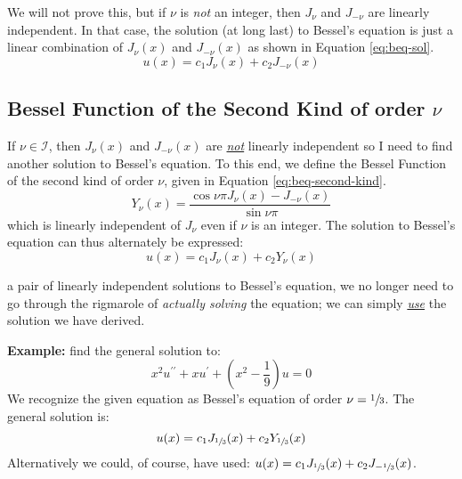 We will not prove this, but if $\nu$ is \emph{not} an integer, then $J_{\nu}$ and $J_{-\nu}$ are linearly independent. In that case, the solution (at long last) to Bessel's equation is just a linear combination of $J_{\nu}(x)$ and $J_{-\nu}(x)$ as shown in Equation \ref{eq:beq-sol}.
\begin{equation}
u(x) = c_1J_{\nu}(x) + c_2J_{-\nu}(x)
\label{eq:beq-sol}
\end{equation}

\subsection{Bessel Function of the Second Kind of order $\nu$}
If $\nu \in \mathcal{I}$, then $J_{\nu}(x)$ and $J_{-\nu}(x)$ are \emph{\underline{not}} linearly independent so I need to find another solution to Bessel's equation.  To this end, we define the Bessel Function of the second kind of order $\nu$, given in Equation \ref{eq:beq-second-kind}.
\begin{equation}
Y_{\nu}(x) = \frac{\cos{\nu \pi} J_{\nu}(x) - J_{-\nu}(x)}{\sin{\nu \pi}}
\label{eq:beq-second-kind}
\end{equation}
which is linearly independent of $J_{\nu}$ even if $\nu$ is an integer.  The solution to Bessel's equation can thus alternately be expressed:
\begin{equation*}
u(x) = c_1J_{\nu}(x) + c_2Y_{\nu}(x)
\end{equation*}

 a pair of linearly independent solutions to Bessel's equation, we no longer need to go through the rigmarole of \emph{actually solving} the equation; we can simply \emph{\underline{use}} the solution we have derived.

\vspace{1.0cm}

\noindent\textbf{Example:} find the general solution to:
\begin{equation*}
x^2u^{\prime \prime} + xu^{\prime} + \left(x^2 - \frac{1}{9} \right)u = 0
\end{equation*}
We recognize the given equation as Bessel's equation of order $\nu = \sfrac{1}{3}$.  The general solution is: 
\begin{equation*}
u(x) = c_1J_{\sfrac{1}{3}}(x) + c_2Y_{\sfrac{1}{3}}(x)
\end{equation*}
Alternatively we could, of course, have used: $u(x) = c_1J_{\sfrac{1}{3}}(x) + c_2J_{-\sfrac{1}{3}}(x)$.

